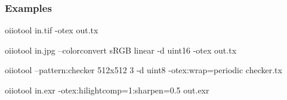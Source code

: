 \subsubsection*{Examples}

\begin{code}
oiiotool in.tif -otex out.tx

oiiotool in.jpg --colorconvert sRGB linear -d uint16 -otex out.tx

oiiotool --pattern:checker 512x512 3 -d uint8 -otex:wrap=periodic checker.tx

oiiotool in.exr -otex:hilightcomp=1:sharpen=0.5 out.exr
\end{code}


